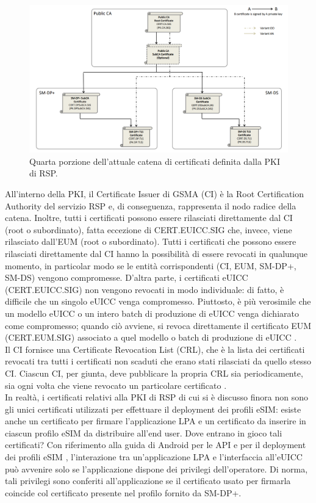 \documentclass[10pt, oneside]{book}
\begin{document}
\begin{figure}
\includegraphics[width=\linewidth]{cert-chain-new4.png}
\caption{Quarta porzione dell'attuale catena di certificati definita dalla PKI di RSP.}
\label{fig:cert-chain-new4}
\end{figure}
All'interno della PKI, il Certificate Issuer di GSMA (CI) è la Root Certification Authority del servizio RSP e, di conseguenza, rappresenta il nodo radice della catena. Inoltre, tutti i certificati possono essere rilasciati direttamente dal CI (root o subordinato), fatta eccezione di CERT.EUICC.SIG che, invece, viene rilasciato dall'EUM (root o subordinato). Tutti i certificati che possono essere rilasciati direttamente dal CI hanno la possibilità di essere revocati in qualunque momento, in particolar modo se le entità corrispondenti (CI, EUM, SM-DP+, SM-DS) vengono compromesse. D'altra parte, i certificati eUICC (CERT.EUICC.SIG) non vengono revocati in modo individuale: di fatto, è difficile che un singolo eUICC venga compromesso. Piuttosto, è più verosimile che un modello eUICC o un intero batch di produzione di eUICC venga dichiarato come compromesso; quando ciò avviene, si revoca direttamente il certificato EUM (CERT.EUM.SIG) associato a quel modello o batch di produzione di eUICC \cite{GSMA-docs-new}.\\
Il CI fornisce una Certificate Revocation List (CRL), che è la lista dei certificati revocati tra tutti i certificati non scaduti che erano stati rilasciati da quello stesso CI. Ciascun CI, per giunta, deve pubblicare la propria CRL sia periodicamente, sia ogni volta che viene revocato un particolare certificato \cite{GSMA-docs-new}.\\
In realtà, i certificati relativi alla PKI di RSP di cui si è discusso finora non sono gli unici certificati utilizzati per effettuare il deployment dei profili eSIM: esiste anche un certificato per firmare l'applicazione LPA e un certificato da inserire in ciascun profilo eSIM da distribuire all'end user. Dove entrano in gioco tali certificati? Con riferimento alla guida di Android per le API e per il deployment dei profili eSIM \cite{Android-docs}, l'interazione tra un'applicazione LPA e l'interfaccia all'eUICC può avvenire solo se l'applicazione dispone dei privilegi dell'operatore. Di norma, tali privilegi sono conferiti all'applicazione se il certificato usato per firmarla coincide col certificato presente nel profilo fornito da SM-DP+.
\end{document}
